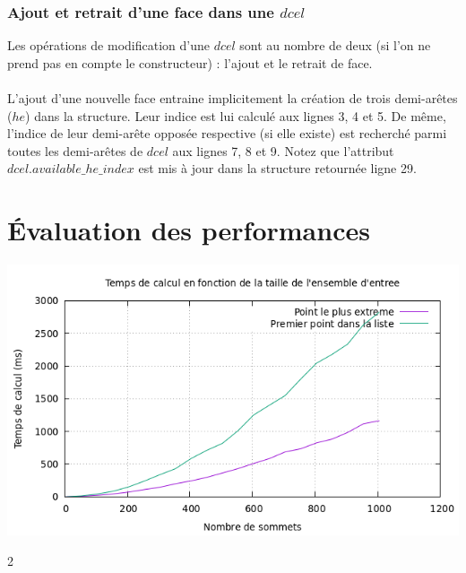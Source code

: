 \documentclass[]{article}
\begin{document}
\begin{multicols}{2}
	
	\subsubsection{Ajout et retrait d'une face dans une $dcel$}
	Les opérations de modification d'une $dcel$ sont au nombre de deux (si l'on ne prend pas en compte le constructeur) : l'ajout et le retrait de face.\\\\
	L'ajout d'une nouvelle face entraine implicitement la création de trois demi-arêtes ($he$) dans la structure. Leur indice est lui calculé aux lignes 3, 4 et 5. De même, l'indice de leur demi-arête opposée respective (si elle existe) est recherché parmi toutes les demi-arêtes de $dcel$ aux lignes 7, 8 et 9.
	Notez que l'attribut $dcel.available\_he\_index$ est mis à jour dans la structure retournée ligne 29.
%		
%		
	
\section{Évaluation des performances}

\includegraphics[scale=.5]{perf_extreme.png}

\end{multicols}{2}
\end{document}
